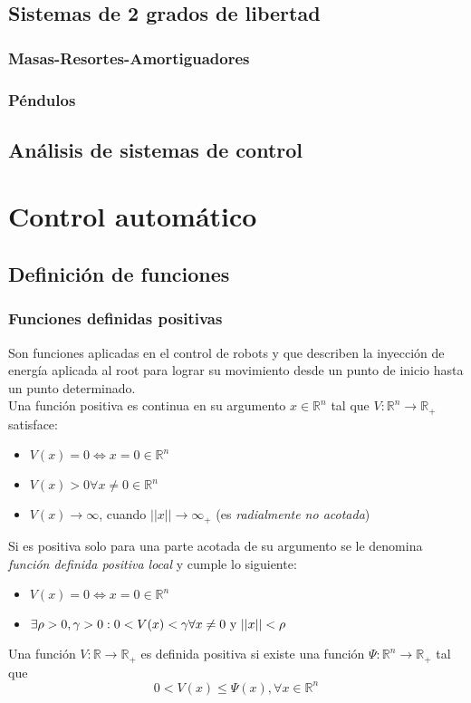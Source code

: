 \documentclass[12pt,spanish,lettersize]{report}
\begin{document}
\section{Sistemas de 2 grados de libertad}
\subsection{Masas-Resortes-Amortiguadores}
\subsection{P\'endulos}
\section{An\'alisis de sistemas de control}
\chapter{Control autom\'atico}
\section{Definici\'on de funciones}
\subsection{Funciones definidas positivas}
Son funciones aplicadas en el control de robots y que describen la inyecci\'on de energ\'ia aplicada al root para lograr su movimiento desde un punto de inicio hasta un punto determinado.\\
Una funci\'on positiva es continua en su argumento $x\in\mathbb{R}^n$ tal que $V:\mathbb{R}^n\rightarrow\mathbb{R}_+$ satisface:
\begin{itemize}
\item $V(x) = 0 \Leftrightarrow x=0\in\mathbb{R}^n$
\item $V(x)>0 \forall x\ne 0\in\mathbb{R}^n$
\item $V(x)\rightarrow\infty$, cuando $||x||\rightarrow\infty_+$ (es \emph{radialmente no acotada})
\end{itemize}
Si es positiva solo para una parte acotada de su argumento se le denomina \emph{funci\'on definida positiva local} y cumple lo siguiente:
\begin{itemize}
\item $V(x)=0 \Leftrightarrow x=0\in\mathbb{R}^n$
\item $\exists \rho>0, \gamma>0:0<V(x)<\gamma \forall x\ne 0\textnormal{ y }||x||<\rho$
\end{itemize}
Una funci\'on $V:\mathbb{R}\rightarrow\mathbb{R}_+$ es definida positiva si existe una funci\'on $\Psi:\mathbb{R}^n\rightarrow\mathbb{R}_+$ tal que
\begin{equation}
0<V(x)\le\Psi(x), \forall x\in\mathbb{R}^n
\end{equation}
\end{document}

